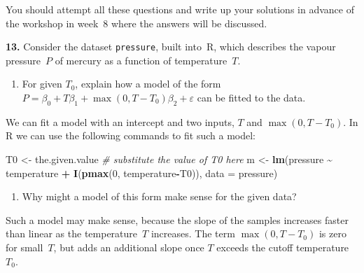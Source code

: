 \documentclass[
  a4paper,
]{article}
\newenvironment{Shaded}{\begin{snugshade}}{\end{snugshade}}
\newcommand{\AttributeTok}[1]{\textcolor[rgb]{0.13,0.29,0.53}{#1}}
\newcommand{\CommentTok}[1]{\textcolor[rgb]{0.56,0.35,0.01}{\textit{#1}}}
\newcommand{\DecValTok}[1]{\textcolor[rgb]{0.00,0.00,0.81}{#1}}
\newcommand{\FunctionTok}[1]{\textcolor[rgb]{0.13,0.29,0.53}{\textbf{#1}}}
\newcommand{\NormalTok}[1]{#1}
\newcommand{\OtherTok}[1]{\textcolor[rgb]{0.56,0.35,0.01}{#1}}
\newcommand{\SpecialCharTok}[1]{\textcolor[rgb]{0.81,0.36,0.00}{\textbf{#1}}}
\providecommand{\tightlist}{%
  \setlength{\itemsep}{0pt}\setlength{\parskip}{0pt}}
\theoremstyle{definition}
\theoremstyle{definition}
\theoremstyle{definition}
\theoremstyle{definition}
\theoremstyle{remark}
\begin{document}

You should attempt all these questions and write up your solutions in advance
of the workshop in week~8 where the answers will be discussed.

\textbf{13.} Consider the dataset \texttt{pressure}, built into~R, which
describes the vapour pressure~\(P\) of mercury as a function of
temperature~\(T\).

\begin{enumerate}
\def\labelenumi{\alph{enumi}.}
\tightlist
\item
  For given \(T_0\), explain how a model of the form
  \(P = \beta_0 + T \beta_1 + \max(0, T-T_0) \beta_2 + \varepsilon\) can be
  fitted to the data.
\end{enumerate}

\begin{myanswers}

We can fit a model with an intercept and two inputs,
\(T\) and \(\max(0, T-T_0)\). In R we can use the following
commands to fit such a model:

\begin{Shaded}
\begin{Highlighting}[]
\NormalTok{T0 }\OtherTok{\textless{}{-}}\NormalTok{ the.given.value }\CommentTok{\# substitute the value of T0 here}
\NormalTok{m }\OtherTok{\textless{}{-}} \FunctionTok{lm}\NormalTok{(pressure }\SpecialCharTok{\textasciitilde{}}\NormalTok{ temperature }\SpecialCharTok{+} \FunctionTok{I}\NormalTok{(}\FunctionTok{pmax}\NormalTok{(}\DecValTok{0}\NormalTok{, temperature}\SpecialCharTok{{-}}\NormalTok{T0)),}
        \AttributeTok{data =}\NormalTok{ pressure)}
\end{Highlighting}
\end{Shaded}

\end{myanswers}

\begin{enumerate}
\def\labelenumi{\alph{enumi}.}
\setcounter{enumi}{1}
\tightlist
\item
  Why might a model of this form make sense for the given data?
\end{enumerate}

\begin{myanswers}
Such a model may make sense, because the slope of the
samples increases faster than linear as the temperature~\(T\)
increases. The term \(\max(0, T-T_0)\) is zero for small~\(T\),
but adds an additional slope once \(T\) exceeds the cutoff
temperature~\(T_0\).

\end{myanswers}
\end{document}
